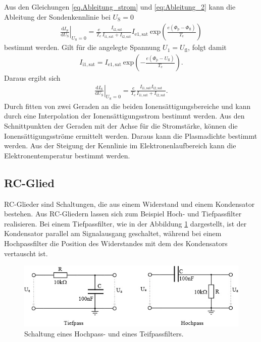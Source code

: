 Aus den Gleichungen \eqref{eq.Ableitung_strom} und \eqref{eq:Ableitung_2} kann die Ableitung der Sondenkennlinie bei $U_{\mathrm{S}}=0$ 
\begin{align}
\left. \frac{\mathrm{d} I_{\mathrm{S}}}{\mathrm{d} U_{\mathrm{S}}}\right\vert_{U_{\mathrm{S}}=0} = \frac{e}{T_{\mathrm{e}}}  \frac{I_{\mathrm{i}2,\mathrm{sat}}}{I_{\mathrm{i}1,\mathrm{sat}}+I_{\mathrm{i}2,\mathrm{sat}}}  I_{\mathrm{e}1,\mathrm{sat}}\ \mathrm{exp} \left( \frac{e(\Phi_{\mathrm{p}}-\Phi_{\mathrm{fl}})}{T_{\mathrm{e}}}\right)
\end{align}
bestimmt werden. Gilt für die angelegte Spannung $U_1=U_{\mathrm{fl}}$, folgt damit
\begin{align}
I_{\mathrm{i}1,\mathrm{sat}} =I_{\mathrm{e}1,\mathrm{sat}}\ \mathrm{exp} \left( -\frac{e(\Phi_{\mathrm{p}}-U_\text{fl})}{T_{\mathrm{e}}} \right).
\end{align}
Daraus ergibt sich
\begin{align}
\left. \frac{\mathrm{d} I_{\mathrm{S}}}{\mathrm{d} U_{\mathrm{S}}}\right\vert_{U_{\mathrm{S}}=0} = \frac{e}{T_{\mathrm{e}}}\frac{I_{\mathrm{i}1,\mathrm{sat}} I_{\mathrm{i}2,\mathrm{sat}} }{I_{\mathrm{i}1,\mathrm{sat}}+I_{\mathrm{i}2,\mathrm{sat}}}.
\end{align}
Durch fitten von zwei Geraden an die beiden Ionensättigungsbereiche und kann durch eine Interpolation der Ionensättigungsstrom bestimmt werden. Aus den Schnittpunkten der Geraden mit der Achse für die Stromstärke, können die Ionensättigungsströme ermittelt werden. Daraus kann die Plasmadichte bestimmt werden.  Aus der Steigung der Kennlinie im Elektronenlaufbereich kann die Elektronentemperatur bestimmt werden.  
\subsection{RC-Glied}
RC-Glieder sind Schaltungen, die aus einem Widerstand und einem Kondensator bestehen.  Aus RC-Gliedern lassen sich zum Beispiel Hoch- und Tiefpassfilter realisieren. Bei einem Tiefpassfilter, wie in der Abbildung \ref{fig:Hochpass_Teifpass} dargestellt, ist der Kondensator parallel am Signalausgang geschaltet, während bei einem Hochpassfilter die Position des Widerstandes mit dem des Kondensators vertauscht ist.   
\begin{figure}[H]
\centering
\includegraphics[scale=0.6]{Hochpass_Tiefpass.jpg}
\caption{Schaltung eines Hochpass- und eines Teifpassfilters. \cite{Hochpass_Tiefpass}}
\label{fig:Hochpass_Teifpass}
\end{figure}